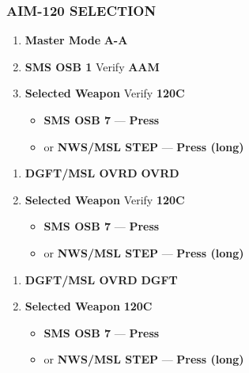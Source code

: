 \subsubsection{AIM-120 SELECTION}
\label{subsec:aim120:selection}
\begin{checklistitemize}
    \begin{enumerate}
        \item \textbf{Master Mode} \dotfill \textbf{A-A}
        \item \textbf{SMS OSB 1} \dotfill Verify \textbf{AAM}
        \item \textbf{Selected Weapon} \dotfill Verify \textbf{120C}
        \begin{itemize}
            \item \textbf{SMS OSB 7} --- \textbf{Press}
            \item or \textbf{NWS/MSL STEP} --- \textbf{Press (long)}
        \end{itemize}
    \end{enumerate}
    \begin{enumerate}
        \item \textbf{DGFT/MSL OVRD} \dotfill \textbf{OVRD}
        \item \textbf{Selected Weapon} \dotfill Verify \textbf{120C} 
        \begin{itemize}
            \item \textbf{SMS OSB 7} --- \textbf{Press}
            \item or \textbf{NWS/MSL STEP} --- \textbf{Press (long)}
        \end{itemize}
    \end{enumerate}
    \begin{enumerate}
        \item \textbf{DGFT/MSL OVRD} \dotfill \textbf{DGFT}
        \item \textbf{Selected Weapon} \dotfill \textbf{120C}
        \begin{itemize}
            \item \textbf{SMS OSB 7} --- \textbf{Press}
            \item or \textbf{NWS/MSL STEP} --- \textbf{Press (long)}
        \end{itemize}
    \end{enumerate}
\end{checklistitemize}


